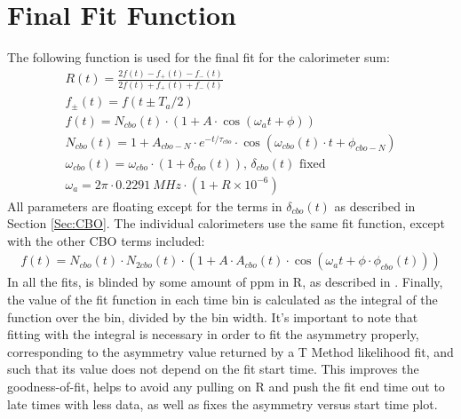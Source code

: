 \clearpage

\section{Final Fit Function}
\label{Sec:FinalFitFunction}

	The following function is used for the final fit for the calorimeter sum:
	\begin{gather}
		R(t) = \frac{2f(t) - f_{+}(t) - f_{-}(t)}{2f(t) + f_{+}(t) + f_{-}(t)} \\[6pt]
		f_{\pm}(t) = f(t \pm T_{a}/2) \\[6pt]
		f(t) = N_{cbo}(t) \cdot (1 + A \cdot \cos(\omega_{a}t + \phi)) \\[6pt]
		N_{cbo}(t) = 1 + A_{cbo-N} \cdot e^{-t/\tau_{cbo}} \cdot \cos(\omega_{cbo}(t) \cdot t + \phi_{cbo-N}) \\[6pt]
		\omega_{cbo}(t) = \omega_{cbo} \cdot (1 + \delta_{cbo}(t)) \text{, $\delta_{cbo}(t)$ fixed} \\[6pt]
		\omega_{a} = 2 \pi \cdot \SI{0.2291}{MHz} \cdot (1 + R \times 10^{-6})
	\end{gather}
	All parameters are floating except for the terms in $\delta_{cbo}(t)$ as described in Section \ref{Sec:CBO}. The individual calorimeters use the same fit function, except with the other CBO terms included:
	\begin{gather}
			f(t) = N_{cbo}(t) \cdot N_{2cbo}(t) \cdot (1 + A \cdot A_{cbo}(t) \cdot \cos(\omega_{a}t + \phi \cdot \phi_{cbo}(t)))
	\end{gather}
	In all the fits, \wa is blinded by some amount of ppm in R, as described in . Finally, the value of the fit function in each time bin is calculated as the integral of the function over the bin, divided by the bin width. It's important to note that fitting with the integral is necessary in order to fit the asymmetry properly, corresponding to the asymmetry value returned by a T Method likelihood fit, and such that its value does not depend on the fit start time. This improves the goodness-of-fit, helps to avoid any pulling on R and push the fit end time out to late times with less data, as well as fixes the asymmetry versus start time plot.
